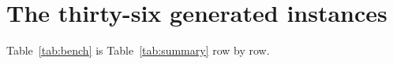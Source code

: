 \section{The thirty-six generated instances}
\label{appendix:B}

Table~\ref{tab:bench} is Table~\ref{tab:summary} row by row.


